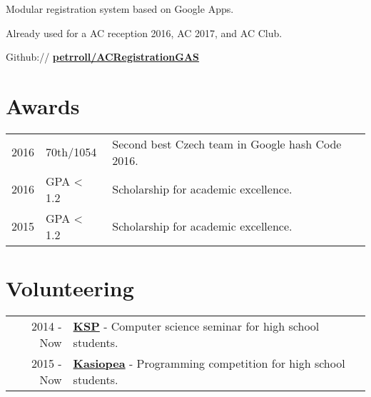 \documentclass[a4paper]{deedy-resume} %
\begin{document}
\begin{minipage}[t]{0.62\textwidth}
\emptyLocation %
\begin{tightitemize}
\item Modular registration system based on Google Apps.
\item Already used for a AC reception 2016, AC 2017, and AC Club.
\item Github:// \href{https://github.com/petrroll/ACRegistrationGAS}{\bf petrroll/ACRegistrationGAS}
\end{tightitemize}

\sectionspace %


\section{Awards} 

\begin{tabular}{rll}
2016 & 70th/1054 & Second best Czech team in Google hash Code 2016. \\
2016 & GPA < 1.2 & Scholarship for academic excellence. \\
2015 & GPA < 1.2 & Scholarship for academic excellence. \\
\end{tabular}

\sectionspace %


\section{Volunteering} 

\begin{tabular}{rll}
2014 - Now & \href{https://ksp.mff.cuni.cz/}{\bf KSP} - Computer science seminar for high school students. \\
2015 - Now & \href{https://kasiopea.matfyz.cz/}{\bf Kasiopea} - Programming competition for high school students. \\
\end{tabular}

\sectionspace %


\end{minipage} %
\end{document}
